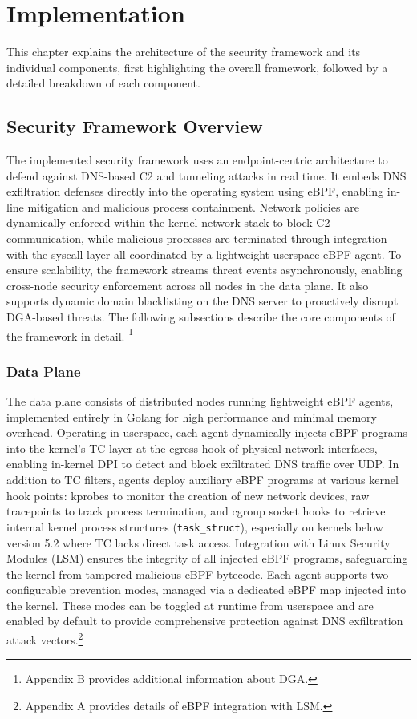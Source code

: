 \documentclass [11pt, proquest] {uwthesis}[2020/02/24]
\begin{document}
\chapter{Implementation}
This chapter explains the architecture of the security framework and its individual components, first highlighting the overall framework, followed by a detailed breakdown of each component.
\section{Security Framework Overview}
The implemented security framework uses an endpoint-centric architecture to defend against DNS-based C2 and tunneling attacks in real time. It embeds DNS exfiltration defenses directly into the operating system using eBPF, enabling in-line mitigation and malicious process containment. Network policies are dynamically enforced within the kernel network stack to block C2 communication, while malicious processes are terminated through integration with the syscall layer all coordinated by a lightweight userspace eBPF agent. To ensure scalability, the framework streams threat events asynchronously, enabling cross-node security enforcement across all nodes in the data plane. It also supports dynamic domain blacklisting on the DNS server to proactively disrupt DGA-based threats. The following subsections describe the core components of the framework in detail. \footnote{Appendix B provides additional information about DGA.}


\subsection{Data Plane}
The data plane consists of distributed nodes running lightweight eBPF agents, implemented entirely in Golang for high performance and minimal memory overhead. Operating in userspace, each agent dynamically injects eBPF programs into the kernel’s TC layer at the egress hook of physical network interfaces, enabling in-kernel DPI to detect and block exfiltrated DNS traffic over UDP. In addition to TC filters, agents deploy auxiliary eBPF programs at various kernel hook points: kprobes to monitor the creation of new network devices, raw tracepoints to track process termination, and cgroup socket hooks to retrieve internal kernel process structures (\texttt{task\_struct}), especially on kernels below version 5.2 where TC lacks direct task access. Integration with Linux Security Modules (LSM) ensures the integrity of all injected eBPF programs, safeguarding the kernel from tampered malicious eBPF bytecode. Each agent supports two configurable prevention modes, managed via a dedicated eBPF map injected into the kernel. These modes can be toggled at runtime from userspace and are enabled by default to provide comprehensive protection against DNS exfiltration attack vectors.\footnote{Appendix A provides details of eBPF integration with LSM.}
\end{document}
